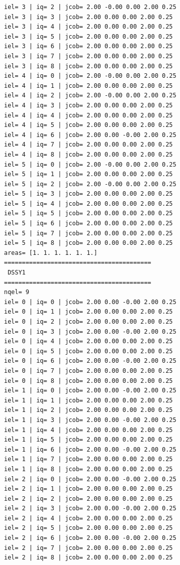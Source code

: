 \begin{tiny}
\begin{verbatim}
iel= 3 | iq= 2 | jcob= 2.00 -0.00 0.00 2.00 0.25
iel= 3 | iq= 3 | jcob= 2.00 0.00 0.00 2.00 0.25
iel= 3 | iq= 4 | jcob= 2.00 0.00 0.00 2.00 0.25
iel= 3 | iq= 5 | jcob= 2.00 0.00 0.00 2.00 0.25
iel= 3 | iq= 6 | jcob= 2.00 0.00 0.00 2.00 0.25
iel= 3 | iq= 7 | jcob= 2.00 0.00 0.00 2.00 0.25
iel= 3 | iq= 8 | jcob= 2.00 0.00 0.00 2.00 0.25
iel= 4 | iq= 0 | jcob= 2.00 -0.00 0.00 2.00 0.25
iel= 4 | iq= 1 | jcob= 2.00 0.00 0.00 2.00 0.25
iel= 4 | iq= 2 | jcob= 2.00 -0.00 0.00 2.00 0.25
iel= 4 | iq= 3 | jcob= 2.00 0.00 0.00 2.00 0.25
iel= 4 | iq= 4 | jcob= 2.00 0.00 0.00 2.00 0.25
iel= 4 | iq= 5 | jcob= 2.00 0.00 0.00 2.00 0.25
iel= 4 | iq= 6 | jcob= 2.00 0.00 -0.00 2.00 0.25
iel= 4 | iq= 7 | jcob= 2.00 0.00 0.00 2.00 0.25
iel= 4 | iq= 8 | jcob= 2.00 0.00 0.00 2.00 0.25
iel= 5 | iq= 0 | jcob= 2.00 -0.00 0.00 2.00 0.25
iel= 5 | iq= 1 | jcob= 2.00 0.00 0.00 2.00 0.25
iel= 5 | iq= 2 | jcob= 2.00 -0.00 0.00 2.00 0.25
iel= 5 | iq= 3 | jcob= 2.00 0.00 0.00 2.00 0.25
iel= 5 | iq= 4 | jcob= 2.00 0.00 0.00 2.00 0.25
iel= 5 | iq= 5 | jcob= 2.00 0.00 0.00 2.00 0.25
iel= 5 | iq= 6 | jcob= 2.00 0.00 0.00 2.00 0.25
iel= 5 | iq= 7 | jcob= 2.00 0.00 0.00 2.00 0.25
iel= 5 | iq= 8 | jcob= 2.00 0.00 0.00 2.00 0.25
areas= [1. 1. 1. 1. 1. 1.]
=========================================
 DSSY1
=========================================
nqel= 9
iel= 0 | iq= 0 | jcob= 2.00 0.00 -0.00 2.00 0.25
iel= 0 | iq= 1 | jcob= 2.00 0.00 0.00 2.00 0.25
iel= 0 | iq= 2 | jcob= 2.00 0.00 0.00 2.00 0.25
iel= 0 | iq= 3 | jcob= 2.00 0.00 -0.00 2.00 0.25
iel= 0 | iq= 4 | jcob= 2.00 0.00 0.00 2.00 0.25
iel= 0 | iq= 5 | jcob= 2.00 0.00 0.00 2.00 0.25
iel= 0 | iq= 6 | jcob= 2.00 0.00 -0.00 2.00 0.25
iel= 0 | iq= 7 | jcob= 2.00 0.00 0.00 2.00 0.25
iel= 0 | iq= 8 | jcob= 2.00 0.00 0.00 2.00 0.25
iel= 1 | iq= 0 | jcob= 2.00 0.00 -0.00 2.00 0.25
iel= 1 | iq= 1 | jcob= 2.00 0.00 0.00 2.00 0.25
iel= 1 | iq= 2 | jcob= 2.00 0.00 0.00 2.00 0.25
iel= 1 | iq= 3 | jcob= 2.00 0.00 -0.00 2.00 0.25
iel= 1 | iq= 4 | jcob= 2.00 0.00 0.00 2.00 0.25
iel= 1 | iq= 5 | jcob= 2.00 0.00 0.00 2.00 0.25
iel= 1 | iq= 6 | jcob= 2.00 0.00 -0.00 2.00 0.25
iel= 1 | iq= 7 | jcob= 2.00 0.00 0.00 2.00 0.25
iel= 1 | iq= 8 | jcob= 2.00 0.00 0.00 2.00 0.25
iel= 2 | iq= 0 | jcob= 2.00 0.00 -0.00 2.00 0.25
iel= 2 | iq= 1 | jcob= 2.00 0.00 0.00 2.00 0.25
iel= 2 | iq= 2 | jcob= 2.00 0.00 0.00 2.00 0.25
iel= 2 | iq= 3 | jcob= 2.00 0.00 -0.00 2.00 0.25
iel= 2 | iq= 4 | jcob= 2.00 0.00 0.00 2.00 0.25
iel= 2 | iq= 5 | jcob= 2.00 0.00 0.00 2.00 0.25
iel= 2 | iq= 6 | jcob= 2.00 0.00 -0.00 2.00 0.25
iel= 2 | iq= 7 | jcob= 2.00 0.00 0.00 2.00 0.25
iel= 2 | iq= 8 | jcob= 2.00 0.00 0.00 2.00 0.25

\end{verbatim}
\end{tiny}
